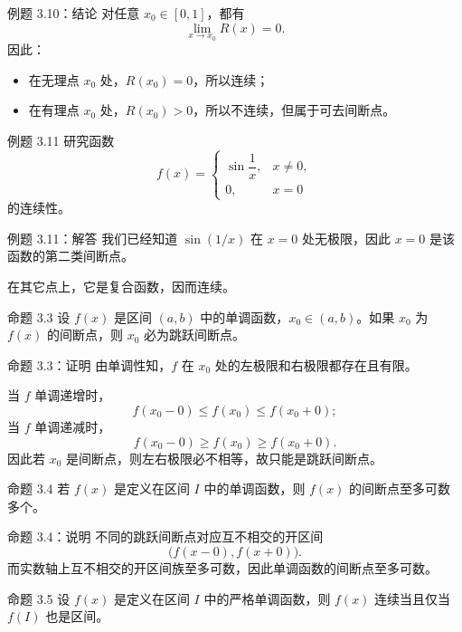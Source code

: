 ﻿\documentclass[aspectratio=169,11pt]{ctexbeamer}
\begin{document}
\begin{frame}{例题 3.10：结论}
对任意 $x_0\in[0,1]$，都有
\[
  \lim_{x\to x_0}R(x)=0.
\]
因此：
\begin{itemize}
  \item 在无理点 $x_0$ 处，$R(x_0)=0$，所以连续；
  \item 在有理点 $x_0$ 处，$R(x_0)>0$，所以不连续，但属于可去间断点。
\end{itemize}
\end{frame}

\begin{frame}{例题 3.11}
研究函数
\[
f(x)=
\begin{cases}
\sin\dfrac1x, & x\ne 0,\\
0, & x=0
\end{cases}
\]
的连续性。
\end{frame}

\begin{frame}{例题 3.11：解答}
我们已经知道 $\sin(1/x)$ 在 $x=0$ 处无极限，因此 $x=0$ 是该函数的第二类间断点。

\vspace{0.6em}
在其它点上，它是复合函数，因而连续。
\end{frame}

\begin{frame}{命题 3.3}
设 $f(x)$ 是区间 $(a,b)$ 中的单调函数，$x_0\in(a,b)$。如果 $x_0$ 为 $f(x)$ 的间断点，则 $x_0$ 必为跳跃间断点。
\end{frame}

\begin{frame}{命题 3.3：证明}
由单调性知，$f$ 在 $x_0$ 处的左极限和右极限都存在且有限。

\vspace{0.6em}
当 $f$ 单调递增时，
\[
  f(x_0-0)\le f(x_0)\le f(x_0+0);
\]
当 $f$ 单调递减时，
\[
  f(x_0-0)\ge f(x_0)\ge f(x_0+0).
\]
因此若 $x_0$ 是间断点，则左右极限必不相等，故只能是跳跃间断点。
\end{frame}

\begin{frame}{命题 3.4}
若 $f(x)$ 是定义在区间 $I$ 中的单调函数，则 $f(x)$ 的间断点至多可数多个。
\end{frame}

\begin{frame}{命题 3.4：说明}
不同的跳跃间断点对应互不相交的开区间
\[
  \bigl(f(x-0),f(x+0)\bigr).
\]
而实数轴上互不相交的开区间族至多可数，因此单调函数的间断点至多可数。
\end{frame}

\begin{frame}{命题 3.5}
设 $f(x)$ 是定义在区间 $I$ 中的严格单调函数，则 $f(x)$ 连续当且仅当 $f(I)$ 也是区间。
\end{frame}
\end{document}
